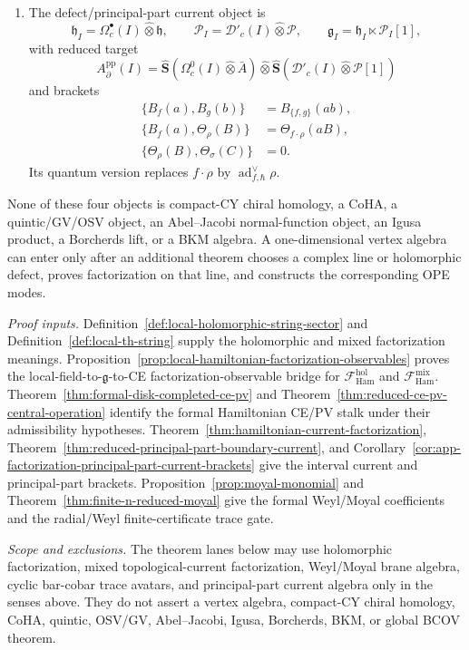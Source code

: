 \begin{stmt}
\begin{enumerate}[label=(\arabic*)]
    \item The defect/principal-part current object is
      \[
        \mathfrak h_I=\Omega^\bullet_c(I)\widehat\otimes\mathfrak h,\qquad
        \mathcal P_I=\mathcal D'_c(I)\widehat\otimes\mathcal P,\qquad
        \mathfrak g_I=\mathfrak h_I\ltimes\mathcal P_I[1],
      \]
      with reduced target
      \[
        A^{\mathrm{pp}}_\partial(I)
        =
        \widehat{\mathbf S}(\Omega_c^0(I)\widehat\otimes\bar A)
        \widehat\otimes
        \widehat{\mathbf S}(\mathcal D'_c(I)\widehat\otimes\mathcal P[1])
      \]
      and brackets
      \[
        \begin{aligned}
        \{B_f(a),B_g(b)\}&=B_{\{f,g\}}(ab),\\
        \{B_f(a),\Theta_\rho(B)\}&=\Theta_{f\cdot\rho}(aB),\\
        \{\Theta_\rho(B),\Theta_\sigma(C)\}&=0 .
        \end{aligned}
      \]
      Its quantum version replaces \(f\cdot\rho\) by
      \(\operatorname{ad}^{\vee}_{f,\hbar}\rho\).
  \end{enumerate}
  None of these four objects is compact-CY chiral homology, a CoHA, a
  quintic/GV/OSV object, an Abel--Jacobi normal-function object, an Igusa
  product, a Borcherds lift, or a BKM algebra.  A one-dimensional vertex
  algebra can enter only after an additional theorem chooses a complex
  line or holomorphic defect, proves factorization on that line, and
  constructs the corresponding OPE modes.

  \emph{Proof inputs.}
  Definition~\ref{def:local-holomorphic-string-sector} and
  Definition~\ref{def:local-th-string} supply the holomorphic and mixed
  factorization meanings.
  Proposition~\ref{prop:local-hamiltonian-factorization-observables}
  proves the local-field-to-\(\mathfrak g\)-to-CE factorization-observable
  bridge for \(\mathcal F_{\mathrm{Ham}}^{\mathrm{hol}}\) and
  \(\mathcal F_{\mathrm{Ham}}^{\mathrm{mix}}\).
  Theorem~\ref{thm:formal-disk-completed-ce-pv}
  and Theorem~\ref{thm:reduced-ce-pv-central-operation} identify the
  formal Hamiltonian CE/PV stalk under their admissibility hypotheses.
  Theorem~\ref{thm:hamiltonian-current-factorization},
  Theorem~\ref{thm:reduced-principal-part-boundary-current}, and
  Corollary~\ref{cor:app-factorization-principal-part-current-brackets}
  give the interval current and principal-part brackets.
  Proposition~\ref{prop:moyal-monomial} and
  Theorem~\ref{thm:finite-n-reduced-moyal} give the formal Weyl/Moyal
  coefficients and the radial/Weyl finite-certificate trace gate.

  \emph{Scope and exclusions.} The theorem lanes below may use
  holomorphic factorization, mixed topological-current factorization,
  Weyl/Moyal brane algebra, cyclic bar-cobar trace avatars, and
  principal-part current algebra only in the senses above.  They do not
  assert a vertex algebra, compact-CY chiral homology, CoHA, quintic,
  OSV/GV, Abel--Jacobi, Igusa, Borcherds, BKM, or global BCOV theorem.
\end{stmt}

